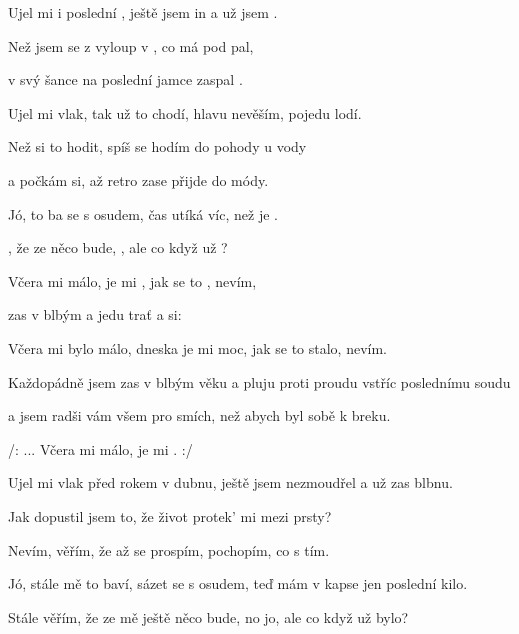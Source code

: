 

\zs
Ujel mi  i poslední , ještě jsem  in a už jsem . 

Než jsem se z  vyloup v , co má  pod pal, 

v  svý šance na poslední jamce zaspal . 
\ks

\zs
Ujel mi vlak, tak už to chodí, hlavu nevěším, pojedu lodí. 

Než si to hodit, spíš se hodím do pohody u vody 

a počkám si, až retro zase přijde do módy. 
\ks

\zs
Jó,   to ba se s osudem,  čas utíká víc, než je . 

 , že ze  něco bude, , ale co když už ? 
\ks

\zr
Včera mi  málo,  je mi , jak se to , nevím, 

  zas v blbým  a jedu  trať a  si: 

Včera mi bylo málo, dneska je mi moc, jak se to stalo, nevím.

Každopádně jsem zas v blbým věku a pluju proti proudu vstříc poslednímu soudu 

a jsem radši vám všem pro smích, než abych byl sobě k breku. 



/:   ... Včera mi  málo,  je mi . :/
\kr

\zs
Ujel mi vlak před rokem v dubnu, ještě jsem nezmoudřel a už zas blbnu. 

Jak dopustil jsem to, že život protek' mi mezi prsty? 

Nevím, věřím, že až se prospím, pochopím, co s tím. 
\ks

\zs
Jó, stále mě to baví, sázet se s osudem, teď mám v kapse jen poslední kilo. 

Stále věřím, že ze mě ještě něco bude, no jo, ale co když už bylo? 
\ks

\zr
\kr

\zr
\kr

\kp
